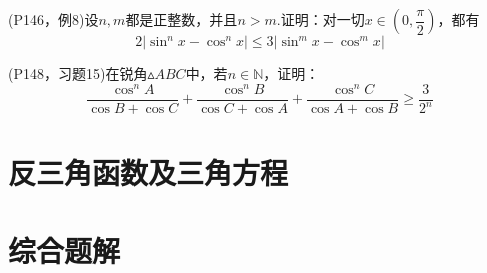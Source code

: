 \documentclass[cn,hazy,black,10pt,normal]{elegantnote}
\newcommand{\ssb}[1]{\left( #1 \right)}
\begin{document}
\newpage
\begin{problem}
	(P146，例8)设$n,m$都是正整数，并且$n>m$.证明：对一切$x \in \ssb{ 0,\dfrac{\pi}{2} }$，都有$$2|\sin ^n x - \cos ^n x| \leq 3|\sin ^m x - \cos ^m x|$$
\end{problem}

\newpage
\begin{problem}
	(P148，习题15)在锐角$\vartriangle ABC$中，若$n \in \mathbb{N}$，证明：$$\frac{\cos ^n A}{\cos B + \cos C} + \frac{\cos ^n B}{\cos C + \cos A} + \frac{\cos ^n C}{\cos A + \cos B} \geq \frac{3}{2^n}$$
\end{problem}

\newpage
\section{反三角函数及三角方程}
\section{综合题解}
\end{document}
